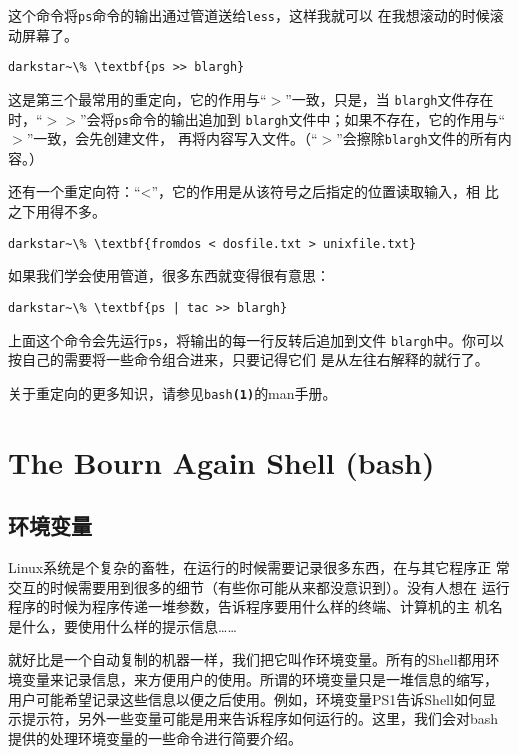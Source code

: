 这个命令将\texttt{ps}命令的输出通过管道送给\texttt{less}，这样我就可以
在我想滚动的时候滚动屏幕了。

\begin{Verbatim}[frame=single, commandchars=\\\{\}]
darkstar~\% \textbf{ps >> blargh}
\end{Verbatim}

这是第三个最常用的重定向，它的作用与``$>$''一致，只是，当
\texttt{blargh}文件存在时，``$>>$''会将\texttt{ps}命令的输出追加到
\texttt{blargh}文件中；如果不存在，它的作用与``$>$''一致，会先创建文件，
再将内容写入文件。（``$>$''会擦除\texttt{blargh}文件的所有内容。）

还有一个重定向符：``<''，它的作用是从该符号之后指定的位置读取输入，相
比之下用得不多。
\begin{Verbatim}[frame=single, commandchars=\\\{\}]
darkstar~\% \textbf{fromdos < dosfile.txt > unixfile.txt}
\end{Verbatim}

如果我们学会使用管道，很多东西就变得很有意思：

\begin{Verbatim}[frame=single, commandchars=\\\{\}]
darkstar~\% \textbf{ps | tac >> blargh}
\end{Verbatim}
上面这个命令会先运行\texttt{ps}，将输出的每一行反转后追加到文件
\texttt{blargh}中。你可以按自己的需要将一些命令组合进来，只要记得它们
是从左往右解释的就行了。

关于重定向的更多知识，请参见\texttt{bash\textbf{(1)}}的man手册。

\section{The Bourn Again Shell (bash)}
\label{sec:shell:bash}

\subsection{环境变量}
\label{sec:shell:bash:environmentVariables}

Linux系统是个复杂的畜牲，在运行的时候需要记录很多东西，在与其它程序正
常交互的时候需要用到很多的细节（有些你可能从来都没意识到）。没有人想在
运行程序的时候为程序传递一堆参数，告诉程序要用什么样的终端、计算机的主
机名是什么，要使用什么样的提示信息……

就好比是一个自动复制的机器一样，我们把它叫作环境变量。所有的Shell都用环
境变量来记录信息，来方便用户的使用。所谓的环境变量只是一堆信息的缩写，
用户可能希望记录这些信息以便之后使用。例如，环境变量PS1告诉Shell如何显
示提示符，另外一些变量可能是用来告诉程序如何运行的。这里，我们会对bash
提供的处理环境变量的一些命令进行简要介绍。

